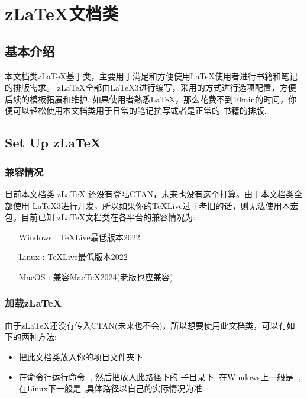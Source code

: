 \chapter{z\LaTeX{}文档类}
\section{基本介绍}
本文档类z\LaTeX{}基于类，主要用于满足和方便使用\LaTeX{}使用者进行书籍和笔记的排版需求。
z\LaTeX{}全部由\LaTeX3进行编写，采用的方式进行选项配置，方便后续的模板拓展和维护.
如果使用者熟悉\LaTeX{}，那么花费不到10min的时间，你便可以轻松使用本文档类用于日常的笔记撰写或者是正常的
书籍的排版. 

\section{Set Up z\LaTeX{}}
\subsection{兼容情况}
目前本文档类 z\LaTeX{} 还没有登陆CTAN，未来也没有这个打算。由于本文档类全部使用
\LaTeX3进行开发，所以如果你的\TeX{}Live过于老旧的话，则无法使用本宏包。目前已知
z\LaTeX{}文档类在各平台的兼容情况为:

\hspace*{10em}\parbox{8cm}{
\begin{itemize}
    \item[Windows]: \TeX{}Live最低版本2022
    \item[Linux]: \TeX{}Live最低版本2022
    \item[MacOS]: 兼容Mac{}\TeX{}2024(老版也应兼容) 
\end{itemize}}

\subsection{加载z\LaTeX{}}
由于z\LaTeX{}还没有传入CTAN(未来也不会)，所以想要使用此文档类，可以有如下的两种方法:
\begin{itemize}
    \item 把此文档类放入你的项目文件夹下
    \item 在命令行运行命令: , 然后把放入此路径下的
        子目录下. 在Windows上一般是: , 在Linux下一般是
        ,具体路径以自己的实际情况为准.
\end{itemize}


